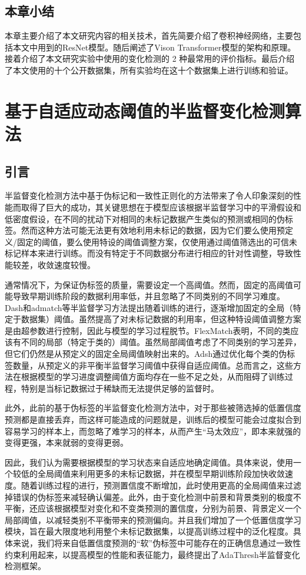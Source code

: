 \documentclass[lang=chs, degree=master, blindreview=false, adobe=false]{yanputhesis}
\begin{document}
\section{本章小结}
本章主要介绍了本文研究内容的相关技术，首先简要介绍了卷积神经网络，主要包括本文中用到的ResNet模型。随后阐述了Vison Transformer模型的架构和原理。接着介绍了本文研究实验中使用的变化检测的 2 种最常用的评价指标。最后介绍了本文使用的十个公开数据集，所有实验均在这十个数据集上进行训练和验证。

\chapter{基于自适应动态阈值的半监督变化检测算法}
\section{引言}
半监督变化检测方法中基于伪标记和一致性正则化的方法带来了令人印象深刻的性能而取得了巨大的成功，其关键思想在于模型应该根据半监督学习中的平滑假设和低密度假设，在不同的扰动下对相同的未标记数据产生类似的预测或相同的伪标签。然而这种方法可能无法更有效地利用未标记的数据，因为它们要么使用预定义/固定的阈值，要么使用特设的阈值调整方案，仅使用通过阈值筛选出的可信未标记样本来进行训练。而没有特定于不同数据分布进行相应的针对性调整，导致性能较差，收敛速度较慢。

通常情况下，为保证伪标签的质量，需要设定一个高阈值。然而，固定的高阈值可能导致早期训练阶段的数据利用率低，并且忽略了不同类别的不同学习难度。Dash和admatch等半监督学习方法提出随着训练的进行，逐渐增加固定的全局（特定于数据集）阈值。虽然提高了对未标记数据的利用率，但这种特设阈值调整方案是由超参数进行控制，因此与模型的学习过程脱节。FlexMatch表明，不同的类应该有不同的局部（特定于类的）阈值。虽然局部阈值考虑了不同类别的学习差异，但它们仍然是从预定义的固定全局阈值映射出来的。Adsh通过优化每个类的伪标签数量，从预定义的非平衡半监督学习阈值中获得自适应阈值。总而言之，这些方法在根据模型的学习进度调整阈值方面均存在一些不足之处，从而阻碍了训练过程，特别是当标记数据过于稀缺而无法提供足够的监督时。

此外，此前的基于伪标签的半监督变化检测方法中，对于那些被筛选掉的低置信度预测都是直接丢弃，而这样可能造成的问题就是，训练后的模型可能会过度拟合到容易学习的样本上，而忽略了难学习的样本，从而产生“马太效应”，即本来就强的变得更强，本来就弱的变得更弱。

因此，我们认为需要根据模型的学习状态来自适应地确定阈值。具体来说，使用一个较低的全局阈值来利用更多的未标记数据，并在模型早期训练阶段加快收敛速度。随着训练过程的进行，预测置信度不断增加，此时使用更高的全局阈值来过滤掉错误的伪标签来减轻确认偏差。此外，由于变化检测中前景和背景类别的极度不平衡，还应该根据模型对变化和不变类预测的置信度，分别为前景、背景定义一个局部阈值，以减轻类别不平衡带来的预测偏向。并且我们增加了一个低置信度学习模块，旨在最大限度地利用整个未标记数据集，以提高训练过程中的泛化程度。具体来说，我们将来自低置信度预测的“软”伪标签中可能存在的正确信息通过一致性约束利用起来，以提高模型的性能和表征能力，最终提出了AdaThresh半监督变化检测框架。
\end{document}
